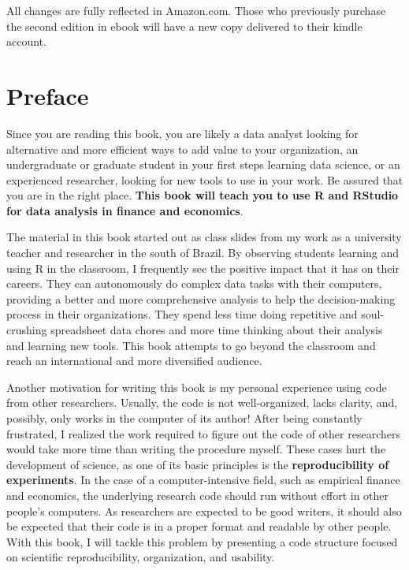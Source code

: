 \documentclass[
  12pt,
]{book}
\begin{document}
All changes are fully reflected in Amazon.com. Those who previously purchase the second edition in ebook will have a new copy delivered to their kindle account.

\hypertarget{preface}{%
\chapter*{Preface}\label{preface}}

Since you are reading this book, you are likely a data analyst looking for alternative and more efficient ways to add value to your organization, an undergraduate or graduate student in your first steps learning data science, or an experienced researcher, looking for new tools to use in your work. Be assured that you are in the right place. \textbf{This book will teach you to use R and RStudio for data analysis in finance and economics}.

The material in this book started out as class slides from my work as a university teacher and researcher in the south of Brazil. By observing students learning and using R in the classroom, I frequently see the positive impact that it has on their careers. They can autonomously do complex data tasks with their computers, providing a better and more comprehensive analysis to help the decision-making process in their organizations. They spend less time doing repetitive and soul-crushing spreadsheet data chores and more time thinking about their analysis and learning new tools. This book attempts to go beyond the classroom and reach an international and more diversified audience.

Another motivation for writing this book is my personal experience using code from other researchers. Usually, the code is not well-organized, lacks clarity, and, possibly, only works in the computer of its author! After being constantly frustrated, I realized the work required to figure out the code of other researchers would take more time than writing the procedure myself. These cases hurt the development of science, as one of its basic principles is the \textbf{reproducibility of experiments}. In the case of a computer-intensive field, such as empirical finance and economics, the underlying research code should run without effort in other people's computers. As researchers are expected to be good writers, it should also be expected that their code is in a proper format and readable by other people. With this book, I will tackle this problem by presenting a code structure focused on scientific reproducibility, organization, and usability.
\end{document}

